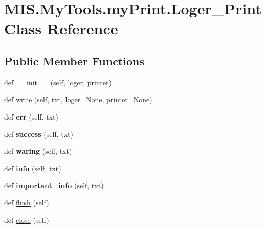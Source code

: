 \hypertarget{classMIS_1_1MyTools_1_1myPrint_1_1Loger__Print}{}\section{M\+I\+S.\+My\+Tools.\+my\+Print.\+Loger\+\_\+\+Print Class Reference}
\label{classMIS_1_1MyTools_1_1myPrint_1_1Loger__Print}
\subsection*{Public Member Functions}
\begin{DoxyCompactItemize}
\item 
def \hyperlink{classMIS_1_1MyTools_1_1myPrint_1_1Loger__Print_a4c6f15d8a4593065730ac2e947d87ba9}{\+\_\+\+\_\+init\+\_\+\+\_\+} (self, loger, printer)
\item 
def \hyperlink{classMIS_1_1MyTools_1_1myPrint_1_1Loger__Print_a5336ec6cc8b36a4efce0f95f64897194}{write} (self, txt, loger=None, printer=None)
\item 
\mbox{\label{classMIS_1_1MyTools_1_1myPrint_1_1Loger__Print_a283cff762caa421cfc663fa03ea8e5dc}} 
def {\bfseries err} (self, txt)
\item 
\mbox{\label{classMIS_1_1MyTools_1_1myPrint_1_1Loger__Print_a367874afa8e28b19eb8208644ffb7686}} 
def {\bfseries success} (self, txt)
\item 
\mbox{\label{classMIS_1_1MyTools_1_1myPrint_1_1Loger__Print_a21e11fd0c6354a93e2e5ab3599dc67cc}} 
def {\bfseries waring} (self, txt)
\item 
\mbox{\label{classMIS_1_1MyTools_1_1myPrint_1_1Loger__Print_ae978f2a19b796c227ddc6b7279eb2284}} 
def {\bfseries info} (self, txt)
\item 
\mbox{\label{classMIS_1_1MyTools_1_1myPrint_1_1Loger__Print_acd4440f2f10f4c7fde9f2f70fe604daa}} 
def {\bfseries important\+\_\+info} (self, txt)
\item 
def \hyperlink{classMIS_1_1MyTools_1_1myPrint_1_1Loger__Print_a383e0a9ff30c8ac916312c8e8bfe2632}{flush} (self)
\item 
def \hyperlink{classMIS_1_1MyTools_1_1myPrint_1_1Loger__Print_a539c17ecbe57d210333603f2672eee8a}{close} (self)
\end{DoxyCompactItemize}
